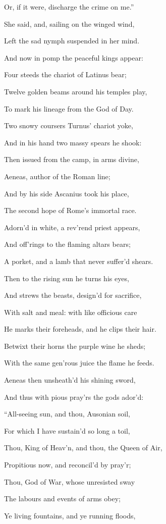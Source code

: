 Or, if it were, discharge the crime on me.”

She said, and, sailing on the winged wind,

Left the sad nymph suspended in her mind.

And now in pomp the peaceful kings appear:

Four steeds the chariot of Latinus bear;

Twelve golden beams around his temples play,

To mark his lineage from the God of Day.

Two snowy coursers Turnus’ chariot yoke,

And in his hand two massy spears he shook:

Then issued from the camp, in arms divine,

Aeneas, author of the Roman line;

And by his side Ascanius took his place,

The second hope of Rome’s immortal race.

Adorn’d in white, a rev’rend priest appears,

And off’rings to the flaming altars bears;

A porket, and a lamb that never suffer’d shears.

Then to the rising sun he turns his eyes,

And strews the beasts, design’d for sacrifice,

With salt and meal: with like officious care

He marks their foreheads, and he clips their hair.

Betwixt their horns the purple wine he sheds;

With the same gen’rous juice the flame he feeds.

Aeneas then unsheath’d his shining sword,

And thus with pious pray’rs the gods ador’d:

“All-seeing sun, and thou, Ausonian soil,

For which I have sustain’d so long a toil,

Thou, King of Heav’n, and thou, the Queen of Air,

Propitious now, and reconcil’d by pray’r;

Thou, God of War, whose unresisted sway

The labours and events of arms obey;

Ye living fountains, and ye running floods,

